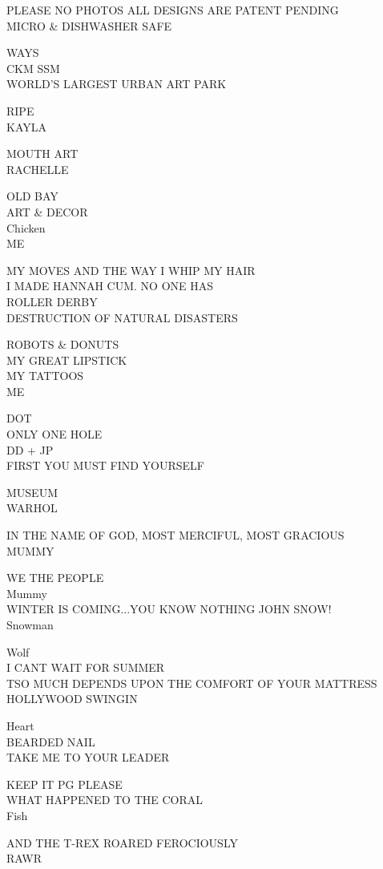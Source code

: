 \documentclass[10pt,letterpaper]{article}
\begin{document}
PLEASE NO PHOTOS ALL DESIGNS ARE PATENT PENDING\\
MICRO \& DISHWASHER SAFE

WAYS\\
CKM SSM\\
WORLD'S LARGEST URBAN ART PARK

RIPE\\
KAYLA

MOUTH ART\\
RACHELLE

OLD BAY\\
ART \& DECOR\\
Chicken\\
ME

MY MOVES AND THE WAY I WHIP MY HAIR\\
I MADE HANNAH CUM.  NO ONE HAS\\
ROLLER DERBY\\
DESTRUCTION OF NATURAL DISASTERS

ROBOTS \& DONUTS\\
MY GREAT LIPSTICK\\
MY TATTOOS\\
ME

DOT\\
ONLY ONE HOLE\\
DD + JP\\
FIRST YOU MUST FIND YOURSELF

MUSEUM\\
WARHOL

IN THE NAME OF GOD, MOST MERCIFUL, MOST GRACIOUS\\
MUMMY

WE THE PEOPLE\\
Mummy\\
WINTER IS COMING...YOU KNOW NOTHING JOHN SNOW!\\
Snowman

Wolf\\
I CANT WAIT FOR SUMMER\\
TSO MUCH DEPENDS UPON THE COMFORT OF YOUR MATTRESS\\
HOLLYWOOD SWINGIN

Heart\\
BEARDED NAIL\\
TAKE ME TO YOUR LEADER

KEEP IT PG PLEASE\\
WHAT HAPPENED TO THE CORAL\\
Fish

AND THE T{-}REX ROARED FEROCIOUSLY\\
RAWR
\end{document}
